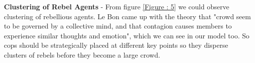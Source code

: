 \documentclass[a4paper,11pt]{article}
\begin{document}
\textbf{Clustering of Rebel Agents} - 
From figure \ref{Figure : 5} we could observe clustering of rebellious agents. 
Le Bon \cite{le2002crowd} came up with the theory that "crowd seem to be governed by a collective mind, and that contagion causes members to experience similar thoughts and emotion", which we can see in our model too. So cops should be strategically placed at different key points so they disperse clusters of rebels before they become a large crowd.
\\





\end{document}
